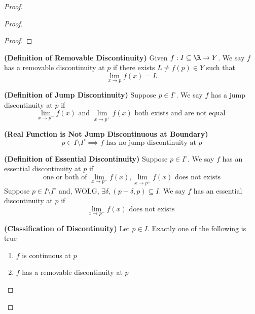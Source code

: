\documentclass{report}
\begin{document}
\begin{proof}
\begin{proof}
\begin{proof}
\end{proof}
\begin{definition}
\label{3.11.10}
\textbf{(Definition of Removable Discontinuity)} Given $f:I\subseteq \R\rightarrow Y$. We say $f$ has a removable discontinuity at $p$ if there exists $L\neq f(p)\in Y$ such that 
\begin{equation*}
\lim_{x\to p}f(x)=L
\end{equation*}
\end{definition}
\begin{definition}
\label{3.11.11}
\textbf{(Definition of Jump Discontinuity)} Suppose $p\in I^\circ $. We say $f$ has a jump discontinuity at  $p$ if
 \begin{equation*}
\lim_{x\to p^-}f(x)\text{ and }\lim_{x\to p^+}f(x)\text{ both exists and are not equal }
\end{equation*}
\end{definition}
\begin{theorem}
\label{3.11.12}
\textbf{(Real Function is Not Jump Discontinuous at Boundary)}  
\begin{equation*}
  p \in I\setminus I^\circ \implies f\text{ has no jump discontinuity at $p$}
\end{equation*}
\end{theorem}
\begin{definition}
\label{3.11.13}
\textbf{(Definition of Essential Discontinuity)} Suppose $p \in I^\circ $. We say $f$ has an essential discontinuity at $p$ if 
\begin{equation*}
\text{ one or both of }\lim_{x\to p^-}f(x),\lim_{x\to p^+}f(x)\text{ does not exists }
\end{equation*}
Suppose $p\in I \setminus  I^\circ $ and, WOLG, $\exists \delta, (p-\delta,p)\subseteq I$. We say $f$ has an essential discontinuity at  $p$ if 
\begin{equation*}
\lim_{x\to p^-}f(x)\text{ does not exists }
\end{equation*}
\end{definition}
\begin{theorem}
\label{3.11.14}
\textbf{(Classification of Discontinuity)} Let $p\in  I$. Exactly one of the following is true
\begin{enumerate}[label=(\alph*)]
  \item $f$ is continuous at $p$ 
  \item $f$ has a removable discontinuity at $p$ 

\end{enumerate}
\end{theorem}
\end{proof}
\end{proof}
\end{document}
